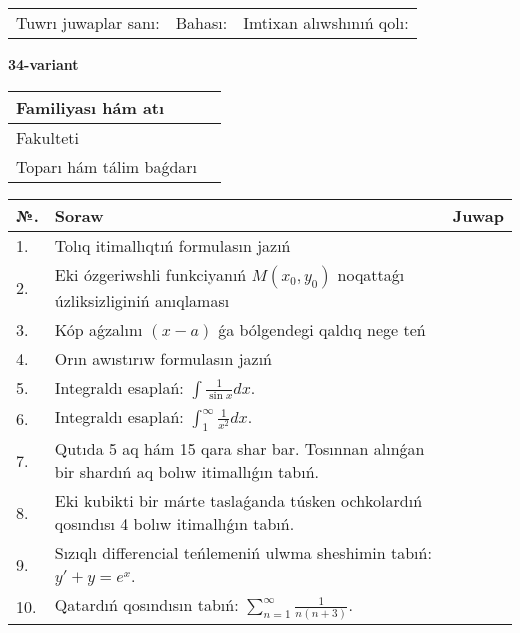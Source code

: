 \documentclass{article}
\begin{document}
\vspace{1cm}

\begin{tabular}{ c c c }
Tuwrı juwaplar sanı: \underline{\hspace{2cm}} & Bahası: \underline{\hspace{2cm}} & Imtixan alıwshınıń qolı: \underline{\hspace{2cm}} \\
\end{tabular}

\newpage

\begin{center}\textbf{34-variant}\end{center}

\bgroup
\def\arraystretch{1.5}
\begin{tabular}{ |m{6cm}|m{10cm}| }
  \hline
  Familiyası hám atı & \\
  \hline
  Fakulteti &\\
  \hline
  Toparı hám tálim baǵdarı & \\
  \hline
\end{tabular}
\egroup

\vspace{0.5cm}

\bgroup
\def\arraystretch{2}
\begin{tabular}{ |l|m{8cm}|m{7cm}| }
  \hline
  №. & Soraw & Juwap \\
  \hline
  1. & Tolıq itimallıqtıń formulasın jazıń &  \\
  \hline
  2. & Eki ózgeriwshli funkciyanıń $M(x_{0} , y_{0})$ noqattaǵı úzliksizliginiń anıqlaması &  \\
  \hline
  3. & Kóp aǵzalını $(x - a)$ ǵa bólgendegi qaldıq nege teń &  \\
  \hline
  4. & Orın awıstırıw formulasın jazıń &  \\
  \hline
  5. & Integraldı esaplań: $\displaystyle\int {\frac{1}{\sin x}dx} $. &  \\
  \hline
  6. & Integraldı esaplań: $\displaystyle\int_{1}^{\infty}{\frac{1}{x^{2}}dx}$. &  \\
  \hline
  7. & Qutıda 5 aq hám 15 qara shar bar. Tosınnan alınǵan bir shardıń aq bolıw itimallıǵın tabıń. &  \\
  \hline
  8. & Eki kubikti bir márte taslaǵanda túsken ochkolardıń qosındısı 4 bolıw itimallıǵın tabıń. &  \\
  \hline
  9. & Sızıqlı differencial teńlemeniń ulwma sheshimin tabıń: $y' + y =e^{x}$. &  \\
  \hline
  10. & Qatardıń qosındısın tabıń: $\displaystyle\sum_{n = 1}^{\infty}\frac{1}{n(n + 3)}$. &  \\
  \hline
\end{tabular}
\egroup
\end{document}
